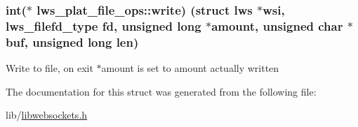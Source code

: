 \subsubsection[{\texorpdfstring{write}{write}}]{\setlength{\rightskip}{0pt plus 5cm}int($\ast$ lws\+\_\+plat\+\_\+file\+\_\+ops\+::write) (struct lws $\ast$wsi, lws\+\_\+filefd\+\_\+type fd, unsigned long $\ast$amount, unsigned char $\ast$buf, unsigned long len)}\hypertarget{structlws__plat__file__ops_a1fae8330ee94649a3551e31a30809793}{}\label{structlws__plat__file__ops_a1fae8330ee94649a3551e31a30809793}
Write to file, on exit $\ast$amount is set to amount actually written 

The documentation for this struct was generated from the following file\+:\begin{DoxyCompactItemize}
\item 
lib/\hyperlink{libwebsockets_8h}{libwebsockets.\+h}\end{DoxyCompactItemize}
